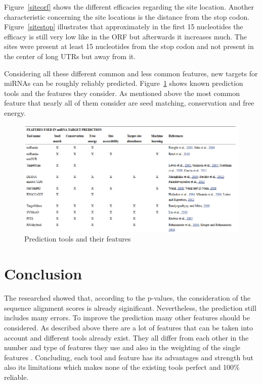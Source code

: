 \documentclass[12pt]{article}
\begin{document}
Figure~\ref{siteorf} shows the different efficacies regarding the site location. Another characteristic concerning the site locations is the distance from the stop codon. Figure~\ref{sitestop} illustrates that approximately in the first 15 nucleotides the efficacy is still very low like in the ORF but afterwards it increases much. 
The sites were present at least 15 nucleotides from the stop codon and not present in the center of long UTRs but away from it. 
   
Considering all these different common and less common features, new targets for miRNAs can be roughly reliably predicted. Figure~\ref{fig:tools} shows known prediction tools and the features they consider. As mentioned above the most common feature that nearly all of them consider are seed matching, conservation and free energy. 


\begin{figure}[h]
\centering
\includegraphics[scale=0.5]{results/tools.PNG}
\caption{Prediction tools and their features}
\label{fig:tools}
\end{figure}


\vspace{2cm}

\section{Conclusion}

The researched showed that, according to the p-values, the consideration of the sequence alignment scores is already siginificant. Nevertheless, the prediction still includes many errors. To improve the prediction many other features should be considered.
As described above there are a lot of features that can be taken into account and different tools already exist. They all differ from each other in the number and type of features they use and also in the weighting of the single features \cite{Peterson}. Concluding, each tool and feature has its advantages and strength but also its limitations which makes none of the existing tools perfect and 100\% reliable.
\end{document}
